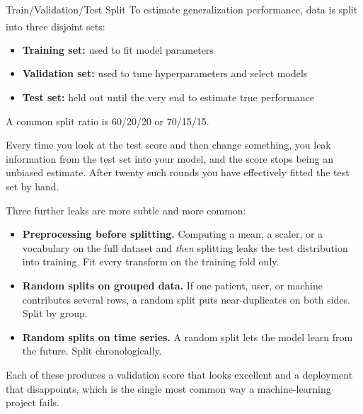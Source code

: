 \begin{v3topic}{Train/Validation/Test Split}
    To estimate generalization performance, data is split into three disjoint sets\textsuperscript{\cite[][pp.~18--20]{iiiCourseMachineLearning}}:
    \begin{itemize}
        \item \textbf{Training set:} used to fit model parameters
        \item \textbf{Validation set:} used to tune hyperparameters and select models
        \item \textbf{Test set:} held out until the very end to estimate true performance
    \end{itemize}
    A common split ratio is 60/20/20 or 70/15/15.

\begin{cautionbox}
Every time you look at the test score and then change something, you leak
information from the test set into your model, and the score stops being an
unbiased estimate. After twenty such rounds you have effectively fitted the
test set by hand.

Three further leaks are more subtle and more common:
\begin{itemize}
  \item \textbf{Preprocessing before splitting.} Computing a mean, a scaler, or
        a vocabulary on the full dataset and \emph{then} splitting leaks the
        test distribution into training. Fit every transform on the training
        fold only.
  \item \textbf{Random splits on grouped data.} If one patient, user, or
        machine contributes several rows, a random split puts near-duplicates
        on both sides. Split by group.
  \item \textbf{Random splits on time series.} A random split lets the model
        learn from the future. Split chronologically.
\end{itemize}
Each of these produces a validation score that looks excellent and a deployment
that disappoints, which is the single most common way a machine-learning
project fails.
\end{cautionbox}

\end{v3topic}
